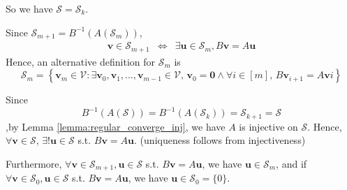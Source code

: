 \documentclass{article}
\newcommand{\0}{\mathbf{0}}
\renewcommand{\vec}{\mathbf}
\newcommand{\vv}{\vec{v}}
\newcommand{\vu}{\vec{u}}
\newcommand{\inv}{^{-1}}
\newcommand{\C}{\mathbb{C}}
\newcommand{\N}{\mathbb{N}}
\newcommand{\vecspace}[1]{\mathcal{#1}}
\newcommand{\vsV}{\vecspace{V}}
\newcommand{\vsS}{\vecspace{S}}
\DeclareMathOperator{\vspan}{span}
\begin{document}
So we have $\vsS = \vsS_k$.


Since $\vsS_{m+1} = B\inv(A(\vsS_{m}))$,
\begin{align*}
    \vv\in\vsS_{m+1}&\iff&\exists\vu\in\vsS_{m}, B\vv=A\vu
\end{align*}
Hence, an alternative definition for $\vsS_m$ is
\begin{equation*}
    \vsS_m = \left\{\vv_m\in\vsV:\exists \vv_0,\vv_1,\dots,\vv_{m-1}\in\vsV,\, \vv_0 = \0 \land \forall i \in [m],\, B\vv_{i+1}=A\vv{i}\right\}
\end{equation*}

Since
\begin{equation*}
    B\inv(A(\vsS)) = B\inv(A(\vsS_k)) = \vsS_{k+1} = \vsS
\end{equation*}
,by Lemma \ref{lemma:regular_converge_inj}, we have $A$ is injective on $\vsS$.
Hence, $\forall\vv\in\vsS$, $\exists!\vu\in\vsS$ s.t. $B\vv=A\vu$. (uniqueness follows from injectiveness)

Furthermore, $\forall\vv\in\vsS_{m+1},\vu\in\vsS$ s.t. $B\vv=A\vu$, we have $\vu\in\vsS_m$,
and if $\forall\vv\in\vsS_0,\vu\in\vsS$ s.t. $B\vv=A\vu$, we have $\vu\in\vsS_0=\{0\}$.






\end{document}
